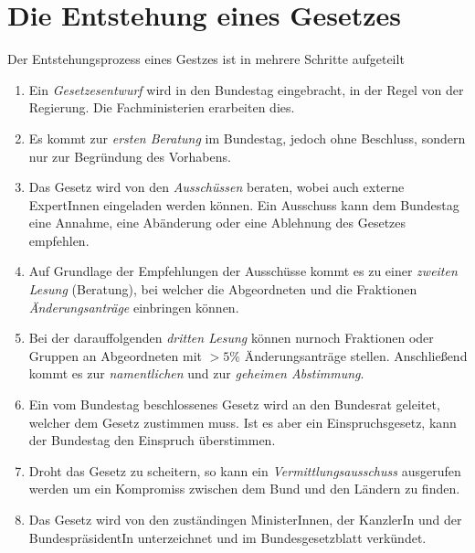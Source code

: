 \documentclass{article}
\begin{document}
\section{Die Entstehung eines Gesetzes}
Der Entstehungsprozess eines Gestzes ist in mehrere Schritte aufgeteilt
\begin{enumerate}
 \item Ein \emph{Gesetzesentwurf} wird in den Bundestag eingebracht, in der Regel von der Regierung. Die Fachministerien erarbeiten dies.
 \item Es kommt zur \emph{ersten Beratung} im Bundestag, jedoch ohne Beschluss, sondern nur zur Begründung des Vorhabens.
 \item Das Gesetz wird von den \emph{Ausschüssen} beraten, wobei auch externe ExpertInnen eingeladen werden können. Ein Ausschuss kann dem Bundestag eine Annahme, eine Abänderung oder eine Ablehnung des Gesetzes empfehlen.
 \item Auf Grundlage der Empfehlungen der Ausschüsse kommt es zu einer \emph{zweiten Lesung} (Beratung), bei welcher die Abgeordneten und die Fraktionen \emph{Änderungsanträge} einbringen können.
 \item Bei der darauffolgenden \emph{dritten Lesung} können nurnoch Fraktionen oder Gruppen an Abgeordneten mit $>5\%$ Änderungsanträge stellen. Anschließend kommt es zur \emph{namentlichen} und zur \emph{geheimen Abstimmung}. 
 \item Ein vom Bundestag beschlossenes Gesetz wird an den Bundesrat geleitet, welcher dem Gesetz zustimmen muss. Ist es aber ein Einspruchsgesetz, kann der Bundestag den Einspruch überstimmen.
 \item Droht das Gesetz zu scheitern, so kann ein \emph{Vermittlungsausschuss} ausgerufen werden um ein Kompromiss zwischen dem Bund und den Ländern zu finden. 
 \item Das Gesetz wird von den zuständingen MinisterInnen, der KanzlerIn und der BundespräsidentIn unterzeichnet und im Bundesgesetzblatt verkündet. 
\end{enumerate} 
\end{document}
